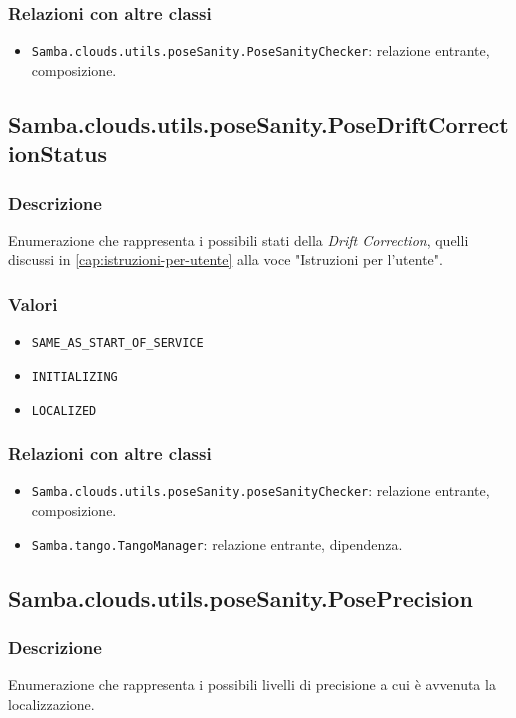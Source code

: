 \subsubsection{Relazioni con altre classi}
\begin{itemize}
	\item \texttt{Samba.clouds.utils.poseSanity.PoseSanityChecker}: relazione entrante, composizione.
\end{itemize}

\subsection{Samba.clouds.utils.poseSanity.PoseDriftCorrectionStatus}
\subsubsection{Descrizione}
Enumerazione che rappresenta i possibili stati della \emph{Drift Correction}, quelli discussi in \ref{cap:istruzioni-per-utente} alla voce "Istruzioni per l'utente".
\subsubsection{Valori}
\begin{itemize}
	\item \texttt{SAME\_AS\_START\_OF\_SERVICE}
	\item \texttt{INITIALIZING}
	\item \texttt{LOCALIZED}		
\end{itemize}
\subsubsection{Relazioni con altre classi}
\begin{itemize}
	\item \texttt{Samba.clouds.utils.poseSanity.poseSanityChecker}: relazione entrante, composizione.
	\item \texttt{Samba.tango.TangoManager}: relazione entrante, dipendenza.
\end{itemize}


\subsection{Samba.clouds.utils.poseSanity.PosePrecision}
\subsubsection{Descrizione}
Enumerazione che rappresenta i possibili livelli di precisione a cui è avvenuta la localizzazione.
